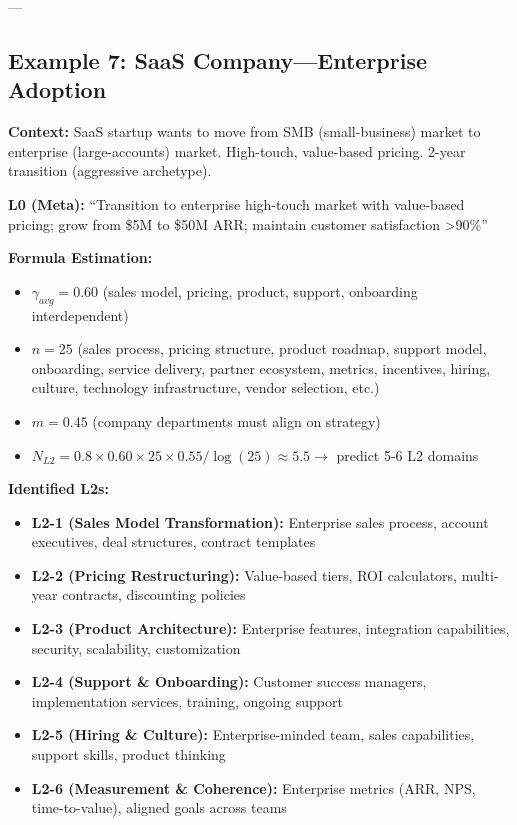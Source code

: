 \documentclass[11pt, a4paper]{article}
\begin{document}
---

\subsection{Example 7: SaaS Company---Enterprise Adoption} \label{sec:ch15-part4h}

\textbf{Context:} SaaS startup wants to move from SMB (small-business) market to enterprise (large-accounts) market. High-touch, value-based pricing. 2-year transition (aggressive archetype).

\textbf{L0 (Meta):} ``Transition to enterprise high-touch market with value-based pricing; grow from \$5M to \$50M ARR; maintain customer satisfaction >90\%''

\textbf{Formula Estimation:}
\begin{itemize}[nosep]
    \item $\gamma_{avg} = 0.60$ (sales model, pricing, product, support, onboarding interdependent)
    \item $n = 25$ (sales process, pricing structure, product roadmap, support model, onboarding, service delivery, partner ecosystem, metrics, incentives, hiring, culture, technology infrastructure, vendor selection, etc.)
    \item $m = 0.45$ (company departments must align on strategy)
    \item $N_{L2} = 0.8 \times 0.60 \times 25 \times 0.55 / \log(25) \approx 5.5 \rightarrow$ predict 5-6 L2 domains
\end{itemize}

\textbf{Identified L2s:}
\begin{itemize}[nosep]
    \item \textbf{L2-1 (Sales Model Transformation):} Enterprise sales process, account executives, deal structures, contract templates
    \item \textbf{L2-2 (Pricing Restructuring):} Value-based tiers, ROI calculators, multi-year contracts, discounting policies
    \item \textbf{L2-3 (Product Architecture):} Enterprise features, integration capabilities, security, scalability, customization
    \item \textbf{L2-4 (Support \& Onboarding):} Customer success managers, implementation services, training, ongoing support
    \item \textbf{L2-5 (Hiring \& Culture):} Enterprise-minded team, sales capabilities, support skills, product thinking
    \item \textbf{L2-6 (Measurement \& Coherence):} Enterprise metrics (ARR, NPS, time-to-value), aligned goals across teams
\end{itemize}
\end{document}
